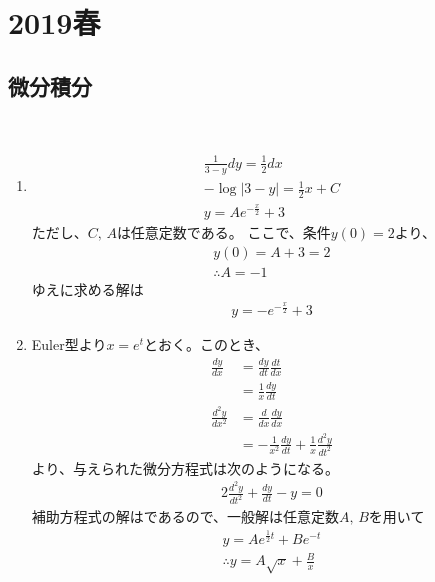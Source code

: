 \newpage
\section{2019春}

\setcounter{yearcounter}{2019}


\subsection{微分積分}
\begin{ans*}
  ${}$
  \begin{enumerate}[label=(\alph*)]
    \item %
    \begin{gather}
      \frac{1}{3-y}dy = \frac{1}{2}dx \\
      -\log|3-y| = \frac{1}{2}x + C \\
      y = Ae^{-\frac{x}{2}} + 3
    \end{gather}
    ただし、$C,\,A$は任意定数である。
    ここで、条件$y(0) = 2$より、
    \begin{gather}
      y(0) = A + 3 = 2 \\
      \therefore  A = -1
    \end{gather}
    ゆえに求める解は
    \begin{gather}
      y = -e^{-\frac{x}{2}} + 3
    \end{gather}
    \item Euler型より$x = e^t$とおく。このとき、
    \begin{align}
      \frac{dy}{dx}
        &= \frac{dy}{dt}\frac{dt}{dx} \\
        &= \frac{1}{x}\frac{dy}{dt} \\
      \frac{d^2y}{dx^2}
        &= \frac{d}{dx}\frac{dy}{dx} \\
        &= -\frac{1}{x^2}\frac{dy}{dt} + \frac{1}{x}\frac{d^2y}{dt^2}
    \end{align}
    より、与えられた微分方程式は次のようになる。
    \begin{align}
      2\frac{d^2y}{dt^2} + \frac{dy}{dt} - y = 0
    \end{align}
    補助方程式の解はであるので、一般解は任意定数$A,\,B$を用いて
    \begin{gather}
      y = Ae^{\frac{1}{2}t} + Be^{-t} \\
      \therefore y = A\sqrt{x} + \frac{B}{x}
    \end{gather}
  \end{enumerate}
\end{ans*}


